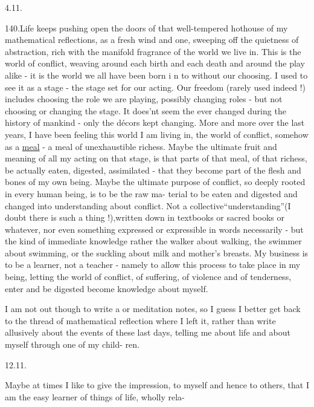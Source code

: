 
4.11.

140.\quad Life keeps pushing open the doors of that well-tempered hothouse
of my mathematical reflections, as a fresh wind and  
one, sweeping off the  quietness of  abstraction,  rich with
the manifold fragrance of the world we live in. This is the world of
conflict, weaving around each birth and each death and around the
 play alike - it is the world we all have been born i n to
without our choosing. I used to see it as a stage - the stage set for
our acting. Our freedom (rarely used indeed !) includes 
choosing the role we are playing, possibly changing roles - but not
choosing or changing the stage. It does'nt seem the  ever changed
during the history of mankind - only the décors kept changing. More
and more  over the last years, I have been feeling this world I am
living in, the world of conflict, somehow as a \uline{meal} - a meal of
unexhaustible richess. Maybe the ultimate fruit and meaning of all my
acting on that stage, is that parts of that meal, of that richess,
be actually eaten, digested, assimilated - that they become part of
the flesh and bones of my own being. Maybe the ultimate purpose of
conflict, so deeply rooted in every human being, is to be the raw ma-%
terial\hand{,} to be eaten and digested and changed into understanding about
conflict. Not a collective``understanding''(I doubt there is such a
thing !),written down in text\hand{$\smile$}books or sacred books or whatever, nor
even something expressed or expressible in words necessarily - but
the kind of immediate knowledge rather the walker  about walking,
the swimmer about swimming, or the suckling about milk and mother's
breasts. My business is to be a learner, not a teacher - namely
to allow this process to take place in my being, letting the world
of conflict, of suffering, of violence and of tenderness, enter
and be digested   become knowledge about myself.

I am not out though to write a   or meditation notes, so I
guess I better get back to the thread of mathematical reflection where
I left it, rather than write allusively about the events of these last
days, telling me about life and about myself through one of my child-%
ren.

12.11.

Maybe at times I like to give the impression, to myself and hence
to others, that I am the easy learner of things of life, wholly rela-%

